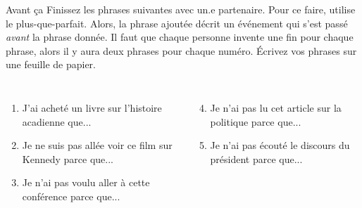\begin{frame}{Avant ça}
  Finissez les phrases suivantes avec un.e partenaire.
  Pour ce faire, \alert{utilise le plus-que-parfait}.
  Alors, la phrase ajoutée décrit un événement qui s'est passé \emph{avant} la phrase donnée.
  Il faut que chaque personne invente une fin pour chaque phrase, alors il y aura \alert{deux} phrases pour chaque numéro.
  Écrivez vos phrases sur une feuille de papier.
  \vspace{0.25cm}
  \begin{columns}[t]
      \begin{enumerate}
        \item J'ai acheté un livre sur l'histoire acadienne que...
        \item Je ne suis pas allée voir ce film sur Kennedy parce que...
        \item Je n'ai pas voulu aller à cette conférence parce que...
      \end{enumerate}
      \begin{enumerate}
        \setcounter{enumi}{3}
        \item Je n'ai pas lu cet article sur la politique parce que...
        \item Je n'ai pas écouté le discours du président parce que...
      \end{enumerate}
  \end{columns}
\end{frame}